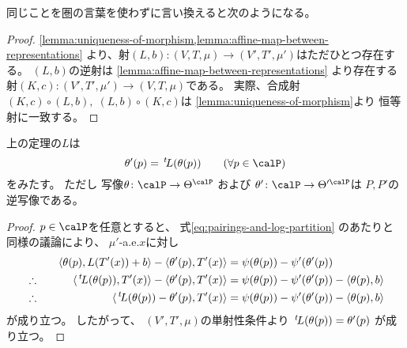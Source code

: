 \documentclass[report]{jlreq}
\begin{document}
同じことを圏の言葉を使わずに言い換えると次のようになる。

\addtocounter{theorem}{-1}

\begin{proof}
    \cref{lemma:uniqueness-of-morphism,lemma:affine-map-between-representations}
    より、射$(L, b) \colon (V, T, \mu) \to (V', T', \mu')$はただひとつ存在する。
    $(L, b)$の逆射は
    \cref{lemma:affine-map-between-representations}
    より存在する射$(K, c) \colon (V', T', \mu') \to (V, T, \mu)$である。
    実際、合成射$(K, c) \circ (L, b), \; (L, b) \circ (K, c)$は
    \cref{lemma:uniqueness-of-morphism}より
    恒等射に一致する。
\end{proof}

\begin{corollary}[自然パラメータの変換]
    上の定理の$L$は
    \begin{equation}
        \theta'(p)
            = \up{t}L(\theta(p))
            \qquad
            (\forall p \in \calP)
    \end{equation}
    をみたす。
    ただし
    写像$\theta \colon \calP \to \Theta^\calP$
    および
    $\theta' \colon \calP \to \Theta'^\calP$は
    $P, P'$の逆写像である。
\end{corollary}

\begin{proof}
    $p \in \calP$を任意とすると、
    式\cref{eq:pairings-and-log-partition}
    のあたりと同様の議論により、
    $\mu'$-a.e.$x$に対し
    \begin{alignat}{2}
        &\phantom{\therefore}&
            \left\langle{\theta(p)},{L(T'(x)) + b}\right\rangle
            - \left\langle{\theta'(p)},{T'(x)}\right\rangle
            &=
                \psi(\theta(p)) - \psi'(\theta'(p))
                \\
        &\therefore \quad&
            \langle{\,{}^{t}\!L(\theta(p))},{T'(x)}\rangle
            - \left\langle{\theta'(p)},{T'(x)}\right\rangle
            &=
                \psi(\theta(p)) - \psi'(\theta'(p))
                - \left\langle{\theta(p)},{b}\right\rangle
                \\
        &\therefore \quad&
            \langle{\,{}^{t}\!L(\theta(p)) - \theta'(p)},{T'(x)}\rangle
            &=
                \psi(\theta(p)) - \psi'(\theta'(p))
                - \left\langle{\theta(p)},{b}\right\rangle
    \end{alignat}
    が成り立つ。
    したがって、
    $(V', T', \mu)$の単射性条件より
    $\,{}^{t}\!L(\theta(p)) = \theta'(p)$
    が成り立つ。
\end{proof}
\end{document}
